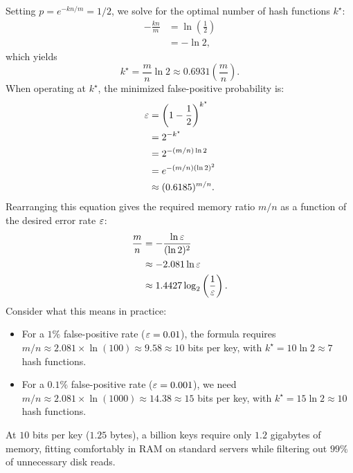 Setting $p = e^{-kn/m} = 1/2$, we solve for the optimal number of hash functions $k^\star$:
\begin{align*}
  -\frac{k n}{m} &= \ln\left(\frac{1}{2}\right) \\
  &= -\ln 2,
\end{align*}
which yields
\[
  k^\star = \frac{m}{n} \ln 2 \approx 0.6931 \left(\frac{m}{n}\right).
\]
When operating at $k^\star$, the minimized false-positive probability is:
\begin{align*}
  \varepsilon &= \left(1 - \frac{1}{2}\right)^{k^\star} \\
  &= 2^{-k^\star} \\
  &= 2^{-(m/n)\ln 2} \\
  &= e^{-(m/n)(\ln 2)^2} \\
  &\approx (0.6185)^{m/n}.
\end{align*}
Rearranging this equation gives the required memory ratio $m/n$ as a function of the desired error rate $\varepsilon$:
\begin{align*}
  \frac{m}{n} &= -\frac{\ln \varepsilon}{(\ln 2)^2} \\
  &\approx -2.081 \ln \varepsilon \\
  &\approx 1.4427 \log_2\left(\frac{1}{\varepsilon}\right).
\end{align*}
Consider what this means in practice:
\begin{itemize}
  \item For a $1\%$ false-positive rate ($\varepsilon = 0.01$), the formula requires $m/n \approx 2.081 \times \ln(100) \approx 9.58 \approx 10$ bits per key, with $k^\star = 10 \ln 2 \approx 7$ hash functions.
  \item For a $0.1\%$ false-positive rate ($\varepsilon = 0.001$), we need $m/n \approx 2.081 \times \ln(1000) \approx 14.38 \approx 15$ bits per key, with $k^\star = 15 \ln 2 \approx 10$ hash functions.
\end{itemize}
At $10$ bits per key ($1.25$ bytes), a billion keys require only $1.2$ gigabytes of memory, fitting comfortably in RAM on standard servers while filtering out $99\%$ of unnecessary disk reads.

